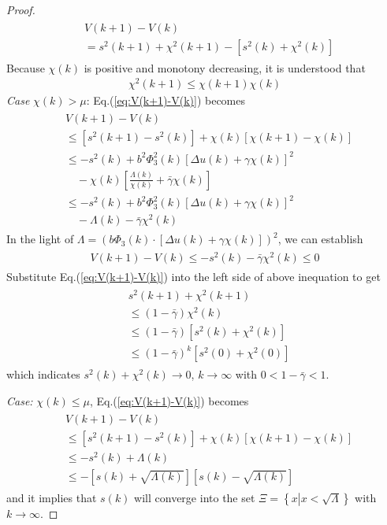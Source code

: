 \documentclass[10pt,final,journal]{IEEEtran}
\begin{document}
\begin{proof}
\begin{align}
\begin{split}
	&V(k+1)-V(k) \\
	&= s^2(k+1)+\chi^2(k+1)-\left[s^2(k)+\chi^2(k)\right]
\end{split}\end{align}
Because $\chi(k)$ is positive and monotony decreasing, it is understood that
\begin{align}
	\chi^2(k+1)\le\chi(k+1)\chi(k) 
\end{align}  
{\it Case} $\chi(k)>\mu$: Eq.(\ref{eq:V(k+1)-V(k)}) becomes
\begin{align}\begin{split} 
	&V(k+1)-V(k) \\
	&\le \left[s^2(k+1)-s^2(k)\right]+\chi(k)\left[\chi(k+1)-\chi(k)\right]\\
	&\le -s^2(k)+b^2\Phi_3^2(k)\left[\Delta u(k)+\gamma\chi(k)\right]^2\\
	&\quad-\chi(k)\left[\frac{\Lambda(k)}{\chi(k)}+\bar\gamma\chi(k)\right]\\
	&\le -s^2(k)+b^2\Phi_3^2(k)\left[\Delta u(k)+\gamma\chi(k)\right]^2\\
	&\quad-\Lambda(k)-\bar\gamma\chi^2(k)
\end{split}\end{align}
In the light of $\Lambda =\left(b\Phi_3(k)\cdot\left[\Delta u(k)+\gamma\chi(k)\right]\right)^2$, we can establish
\begin{align}\begin{split}
	V(k+1)-V(k) \le -s^2(k)-\bar\gamma\chi^2(k)\le 0
\end{split}\end{align}
Substitute Eq.(\ref{eq:V(k+1)-V(k)}) into the left side of above inequation to get
\begin{align}\begin{split}
	&s^2(k+1)+\chi^2(k+1)\\
	&\le(1-\bar\gamma)\chi^2(k)\\
	&\le(1-\bar\gamma)\left[s^2(k)+\chi^2(k)\right]\\
	&\le(1-\bar\gamma)^k\left[s^2(0)+\chi^2(0)\right]
\end{split}\end{align}
which indicates $s^2(k)+\chi^2(k)\to 0$, $k\to \infty$ with $0<1-\bar\gamma<1$.

{\it Case:} $\chi(k)\le\mu$, Eq.(\ref{eq:V(k+1)-V(k)}) becomes
\begin{align}\begin{split}
	&V(k+1)-V(k) \\
	&\le \left[s^2(k+1)-s^2(k)\right]+\chi(k)\left[\chi(k+1)-\chi(k)\right]\\
	&\le -s^2(k)+\Lambda(k)\\
	&\le -\left[s(k)+\sqrt{\Lambda(k)}\right]\left[s(k)-\sqrt{\Lambda(k)}\right]
\end{split}\end{align}
and it implies that $s(k)$ will converge into the set $\Xi=\left\{x\left\vert x<\sqrt{\Lambda}\right.\right\}$ with $k\to\infty$.


\end{proof}
\end{document}
